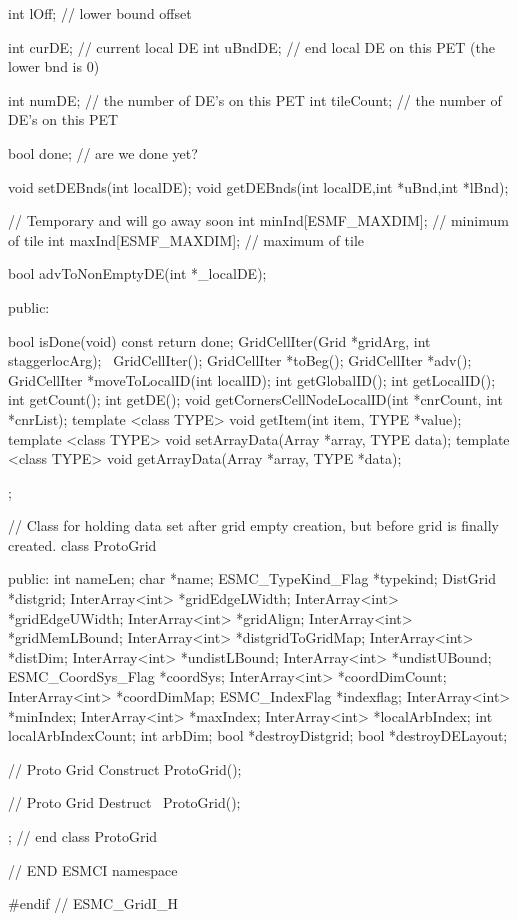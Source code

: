 {{     int lOff;                // lower bound offset
     
     int curDE; // current local DE
     int uBndDE; // end local DE on this PET (the lower bnd is 0)
 
     int numDE; // the number of DE's on this PET
     int tileCount; // the number of DE's on this PET
 
     bool done; // are we done yet?
 
     void setDEBnds(int localDE);
     void getDEBnds(int localDE,int *uBnd,int *lBnd);
 
     // Temporary and will go away soon
     int minInd[ESMF_MAXDIM];  // minimum of tile
     int maxInd[ESMF_MAXDIM];  // maximum of tile
 
     bool advToNonEmptyDE(int *_localDE);
 
   public:
 
   bool isDone(void) const {return done;}
   GridCellIter(Grid *gridArg, int  staggerlocArg);
   ~GridCellIter();
   GridCellIter *toBeg();
   GridCellIter *adv();
   GridCellIter *moveToLocalID(int localID);
   int getGlobalID();
   int getLocalID();
   int getCount();
   int getDE();
   void getCornersCellNodeLocalID(int *cnrCount, int *cnrList);
   template <class TYPE> void getItem(int item, TYPE *value);
   template <class TYPE> void setArrayData(Array *array, TYPE data);
   template <class TYPE> void getArrayData(Array *array, TYPE *data);
   }; 
 
 
  // Class for holding data set after grid empty creation, but before grid is finally created.
 class ProtoGrid { 
  public:
   int nameLen; 
   char *name;  
   ESMC_TypeKind_Flag *typekind;
    DistGrid *distgrid;     
   InterArray<int> *gridEdgeLWidth;
   InterArray<int> *gridEdgeUWidth;
   InterArray<int> *gridAlign;   
   InterArray<int> *gridMemLBound;   
   InterArray<int> *distgridToGridMap;   
   InterArray<int> *distDim;   
   InterArray<int> *undistLBound;  
   InterArray<int> *undistUBound;  
   ESMC_CoordSys_Flag *coordSys;
   InterArray<int> *coordDimCount;  
   InterArray<int> *coordDimMap; 
   ESMC_IndexFlag *indexflag; 
   InterArray<int> *minIndex;
   InterArray<int> *maxIndex;
   InterArray<int> *localArbIndex;
   int localArbIndexCount;
   int arbDim;
   bool *destroyDistgrid;
   bool *destroyDELayout;
 
   // Proto Grid Construct
   ProtoGrid();
 
   // Proto Grid Destruct
   ~ProtoGrid();
          
 }; // end class ProtoGrid
 
  
 } // END ESMCI namespace
 
 #endif  // ESMC_GridI_H
\setlength{\parskip}{\oldparskip}
\setlength{\parindent}{\oldparindent}
\setlength{\baselineskip}{\oldbaselineskip}
